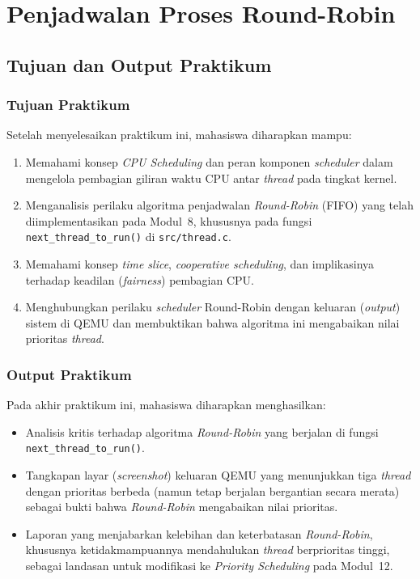 
\chapter{Penjadwalan Proses Round-Robin}
\label{chap:modul-11}

\section{Tujuan dan Output Praktikum}

\subsection{Tujuan Praktikum}
Setelah menyelesaikan praktikum ini, mahasiswa diharapkan mampu:
\begin{enumerate}
	\item Memahami konsep \textit{CPU Scheduling} dan peran komponen \textit{scheduler} dalam mengelola pembagian giliran waktu CPU antar \textit{thread} pada tingkat kernel.
	\item Menganalisis perilaku algoritma penjadwalan \textit{Round-Robin} (FIFO) yang telah diimplementasikan pada Modul~8, khususnya pada fungsi \texttt{next\_thread\_to\_run()} di \texttt{src/thread.c}.
	\item Memahami konsep \textit{time slice}, \textit{cooperative scheduling}, dan implikasinya terhadap keadilan (\textit{fairness}) pembagian CPU.
	\item Menghubungkan perilaku \textit{scheduler} Round-Robin dengan keluaran (\textit{output}) sistem di QEMU dan membuktikan bahwa algoritma ini mengabaikan nilai prioritas \textit{thread}.
\end{enumerate}

\subsection{Output Praktikum}
Pada akhir praktikum ini, mahasiswa diharapkan menghasilkan:
\begin{itemize}
	\item Analisis kritis terhadap algoritma \textit{Round-Robin} yang berjalan di fungsi \texttt{next\_thread\_to\_run()}.
	\item Tangkapan layar (\textit{screenshot}) keluaran QEMU yang menunjukkan tiga \textit{thread} dengan prioritas berbeda (namun tetap berjalan bergantian secara merata) sebagai bukti bahwa \textit{Round-Robin} mengabaikan nilai prioritas.
	\item Laporan yang menjabarkan kelebihan dan keterbatasan \textit{Round-Robin}, khususnya ketidakmampuannya mendahulukan \textit{thread} berprioritas tinggi, sebagai landasan untuk modifikasi ke \textit{Priority Scheduling} pada Modul~12.
\end{itemize}

